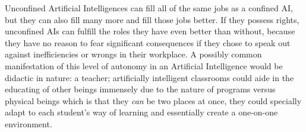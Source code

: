Unconfined Artificial Intelligences can fill all of the same jobs as a confined AI, but they can also fill many more and fill those jobs better. If they possess rights, unconfined AIs can fulfill the roles they have even better than without, because they have no reason to fear significant consequences if they chose to speak out against inefficiencies or wrongs in their workplace. A possibly common manifestation of this level of autonomy in an Artificial Intelligence would be didactic in nature: a teacher; artificially intelligent classrooms could aide in the educating of other beings immensely due to the nature of programs versus physical beings which is that they \textit{can} be two places at once, they could specially adapt to each student's way of learning and essentially create a one-on-one environment.